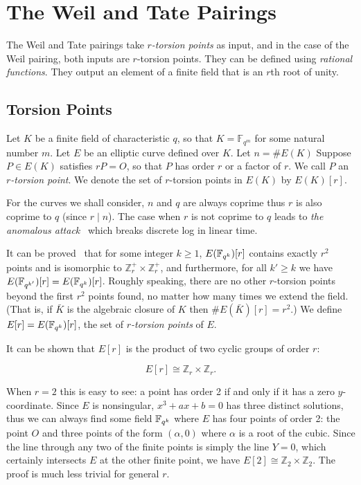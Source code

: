 \chapter {The Weil and Tate Pairings}

The Weil and Tate pairings take \emph{$r$-torsion points}
as input, and in the case of the Weil pairing, both inputs are
$r$-torsion points.
They can be defined using \emph{rational functions}.
They output an element of a finite field that is an $r$th root of unity.

\section {Torsion Points}

Let $K$ be a finite field of characteristic $q$, so that
$K = \mathbb{F}_{q^m}$ for some natural number $m$.
Let $E$ be an elliptic curve defined
over $K$. Let $n=\#E(K)$
Suppose $P\in E(K)$ satisfies $r P = O$, so that $P$ has order $r$ or a
factor of $r$.
We call $P$ an \emph{$r$-torsion point}.
We denote the set of $r$-torsion points in $E(K)$ by
$E(K)[r]$.

For the curves we shall consider,
$n$ and $q$ are always coprime thus $r$ is also coprime to $q$
(since $r \mid n$).
The case when $r$ is not coprime
to $q$ leads to \emph{the anomalous attack}~\cite[Section V.3]{bss}
which breaks discrete log in linear time.

It can be proved~\cite{silverman} that for some integer $k \ge 1$,
$E(\mathbb{F}_{q^k})[r]$ contains exactly $r^2$ points and is isomorphic to
$\mathbb{Z}_r^+ \times \mathbb{Z}_r^+$,
and furthermore, for all $k' \ge k$ we have $E(\mathbb{F}_{q^{k'}})[r]
= E(\mathbb{F}_{q^k})[r]$.
Roughly speaking, there are no other $r$-torsion points beyond the
first $r^2$ points found, no matter how many times we extend the field.
(That is, if $\bar{K}$ is the algebraic closure of $K$ then $\#E(\bar{K})[r] = r^2$.)
We define $E[r] = E(\mathbb{F}_{q^k})[r]$, the set of
\emph{$r$-torsion points} of $E$.

It can be shown that $E[r]$ is the product of two cyclic groups of order $r$:

\[ E[r] \cong \mathbb{Z}_r \times \mathbb{Z}_r . \]

When $r=2$ this is easy to see: a point has order 2 if and only if it has
a zero $y$-coordinate. Since $E$ is nonsingular,
$x^3 + ax + b = 0$ has three distinct solutions, thus we can always find
some field $\mathbb{F}_{q^k}$ where $E$ has
four points of order 2: the point $O$ and three points of the form
$(\alpha, 0)$ where $\alpha$ is a root of the cubic.
Since the line through any two of the finite points is simply the line $Y = 0$,
which certainly intersects $E$ at the other finite point, we have
$E[2] \cong \mathbb{Z}_2 \times \mathbb{Z}_2$.
The proof is much less trivial for general $r$.

